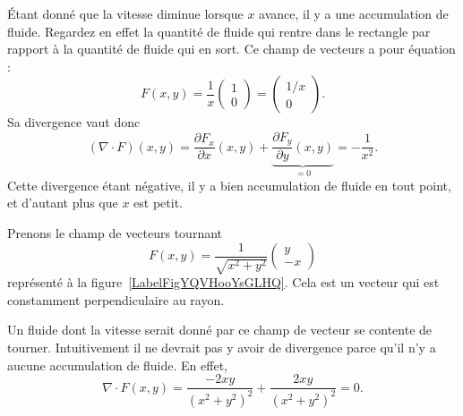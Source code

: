 Étant donné que la vitesse diminue lorsque $x$ avance, il y a une accumulation de fluide. Regardez en effet la quantité de fluide qui rentre dans le rectangle par rapport à la quantité de fluide qui en sort. Ce champ de vecteurs a pour équation :
\begin{equation}
    F(x,y)=\frac{1}{ x }\begin{pmatrix}
        1    \\
        0
    \end{pmatrix}=\begin{pmatrix}
        1/x    \\
        0
    \end{pmatrix}.
\end{equation}
Sa divergence vaut donc
\begin{equation}
    (\nabla\cdot F)(x,y)=\frac{ \partial F_x }{ \partial x }(x,y)+\underbrace{\frac{ \partial F_y }{ \partial y }(x,y)}_{=0}=-\frac{1}{ x^2 }.
\end{equation}
Cette divergence étant négative, il y a bien accumulation de fluide en tout point, et d'autant plus que $x$ est petit.

\begin{example}     \label{ExamDivFrot}

    Prenons le champ de vecteurs tournant
    \begin{equation}
        F(x,y)=\frac{1}{ \sqrt{x^2+y^2} }\begin{pmatrix}
            y    \\
            -x
        \end{pmatrix}
    \end{equation}
    représenté à la figure~\ref{LabelFigYQVHooYsGLHQ}. Cela est un vecteur qui est constamment perpendiculaire au rayon.


\newcommand{\CaptionFigYQVHooYsGLHQ}{Le champ de vecteurs $F(x,y)=(y,-x)$.}


    Un fluide dont la vitesse serait donné par ce champ de vecteur se contente de tourner. Intuitivement il ne devrait pas y avoir de divergence parce qu'il n'y a aucune accumulation de fluide. En effet,
    \begin{equation}
        \nabla\cdot F(x,y)=\frac{ -2xy }{ (x^2+y^2)^2 }+\frac{ 2xy }{ (x^2+y^2)^2 }=0.
    \end{equation}
\end{example}

